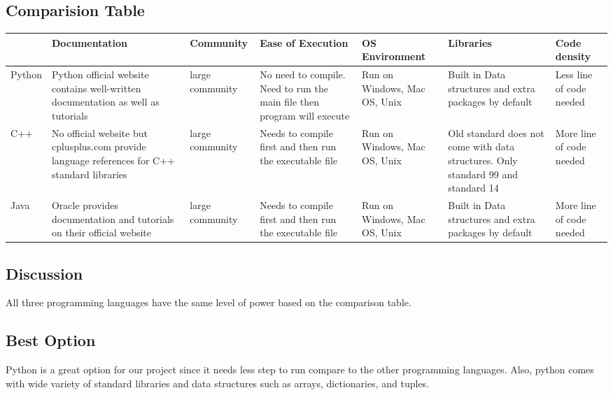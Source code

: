 \documentclass{scrreprt}
\begin{document}
\subsection{Comparision Table}

\begin{tabular}{|l|l|l|l|l|l|l|}
  \hline
   & Documentation & Community  & Ease of Execution & OS Environment & Libraries & Code density \\ \hline
 \parbox{1cm}{Python} & \parbox{2cm}{Python official website contains well-written documentation as well as tutorials}  & \parbox{2cm}{large community}  & \parbox{2cm}{No need to compile. Need to run the main file then program will execute}  & \parbox{2cm}{Run on Windows, Mac OS, Unix } & \parbox{2cm}{Built in Data structures and extra packages by default} & \parbox{2cm}{Less line of code needed }  \\ \hline
 \parbox{1cm}{C++} & \parbox{2cm}{No official website but cplusplus.com provide language references for C++ standard libraries}  &  \parbox{2cm}{large community} &  \parbox{2cm}{Needs to compile first and then run the executable file} &  \parbox{2cm}{Run on Windows, Mac OS, Unix} & \parbox{2cm}{Old standard does not come with data structures. Only standard 99 and standard 14} &  \parbox{2cm}{More line of code needed} \\ \hline
 \parbox{1cm}{Java} &  \parbox{2cm}{Oracle provides documentation and tutorials on their official website}  &   \parbox{2cm}{large community} &  \parbox{2cm}{Needs to compile first and then run the executable file} &  \parbox{2cm}{Run on Windows, Mac OS, Unix} &  \parbox{2cm}{Built in Data structures and extra packages by default} &  \parbox{2cm}{More line of code needed} \\ \hline
\end{tabular}


\subsection{Discussion}
All three programming languages have the same level of power based on the comparison table.

\subsection{Best Option}
Python is a great option for our project since it needs less step to run compare to the other
programming languages. Also, python comes with wide variety of standard libraries and data structures such as
arrays, dictionaries, and tuples.
\end{document}
